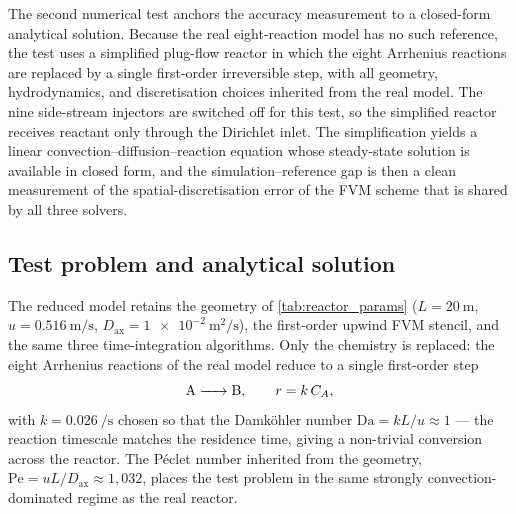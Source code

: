 The second numerical test anchors the accuracy measurement to a closed-form analytical solution. Because the real eight-reaction model has no such reference, the test uses a simplified plug-flow reactor in which the eight Arrhenius reactions are replaced by a single first-order irreversible step, with all geometry, hydrodynamics, and discretisation choices inherited from the real model. The nine side-stream injectors are switched off for this test, so the simplified reactor receives reactant only through the Dirichlet inlet. The simplification yields a linear convection--diffusion--reaction equation whose steady-state solution is available in closed form, and the simulation--reference gap is then a clean measurement of the spatial-discretisation error of the FVM scheme that is shared by all three solvers.

\subsection{Test problem and analytical solution}\label{ssec:test_problem_analytical}

The reduced model retains the geometry of \cref{tab:reactor_params} (\(L = \SI{20}{\metre}\), \(u = \SI{0.516}{\metre\per\second}\), \(D_\mathrm{ax} = \SI{1e-2}{\metre\squared\per\second}\)), the first-order upwind FVM stencil, and the same three time-integration algorithms. Only the chemistry is replaced: the eight Arrhenius reactions of the real model reduce to a single first-order step
\begin{equation}
  \ce{A -> B}, \qquad r = k\,C_A,
  \label{eq:test2_reaction}
\end{equation}
with \(k = \SI{0.026}{\per\second}\) chosen so that the Damköhler number \(\mathrm{Da} = kL/u \approx 1\) --- the reaction timescale matches the residence time, giving a non-trivial conversion across the reactor. The Péclet number inherited from the geometry, \(\mathrm{Pe} = uL/D_\mathrm{ax} \approx 1{,}032\), places the test problem in the same strongly convection-dominated regime as the real reactor.

